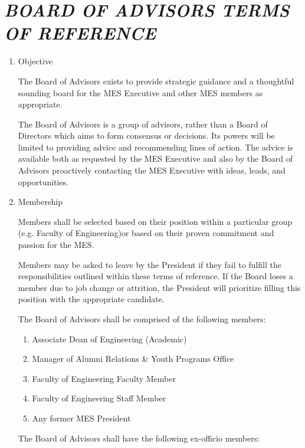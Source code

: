 \hypertarget{board-of-advisors-terms-of-reference}{%
 \section{\texorpdfstring{\emph{BOARD OF ADVISORS TERMS OF
     REFERENCE}}{BOARD OF ADVISORS TERMS OF REFERENCE}}
 \label{board-of-advisors-terms-of-reference}}

\begin{enumerate}
 \item
  Objective

  The Board of Advisors exists to provide strategic guidance and a
  thoughtful sounding board for the MES Executive and other MES members as
  appropriate.

  The Board of Advisors is a group of advisors, rather than a Board of
  Directors which aims to form consensus or decisions. Its powers will be
  limited to providing advice and recommending lines of action. The advice
  is available both as requested by the MES Executive and also by the
  Board of Advisors proactively contacting the MES Executive with ideas,
  leads, and opportunities.

 \item
  Membership

  Members shall be selected based on their position within a particular
  group (e.g. Faculty of Engineering)or based on their proven commitment
  and passion for the MES.

  Members may be asked to leave by the President if they fail to fulfill
  the responsibilities outlined within these terms of reference. If the
  Board loses a member due to job change or attrition, the President will
  prioritize filling this position with the appropriate candidate.

  The Board of Advisors shall be comprised of the following members:

  \begin{enumerate}
   \item
    Associate Dean of Engineering (Academic)
   \item
    Manager of Alumni Relations \& Youth Programs Office
   \item
    Faculty of Engineering Faculty Member
   \item
    Faculty of Engineering Staff Member
   \item
    Any former MES President
  \end{enumerate}

  The Board of Advisors shall have the following ex-officio members:


\end{enumerate}
